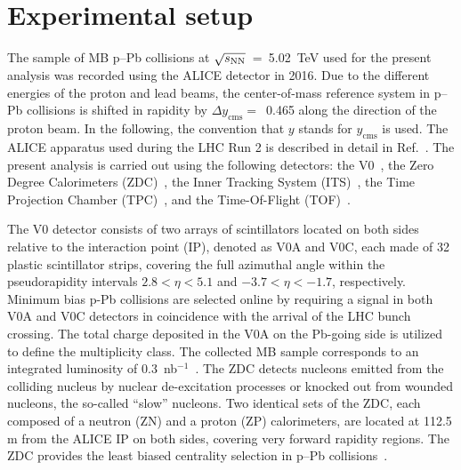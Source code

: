 \section{Experimental setup}
\label{sec:setup}
The sample of MB p--Pb collisions at $\sqrt{s_{\rm NN}}$~=~5.02~TeV used for the present analysis was recorded using the ALICE detector in 2016. Due to the different energies of the proton and lead beams, the center-of-mass reference system in p--Pb collisions is shifted in rapidity by $\Delta y_{\mathrm{cms}} =$~0.465 along the direction of the proton beam. In the following, the convention that $y$ stands for $y_{\mathrm{cms}}$ is used. The ALICE apparatus used during the LHC Run 2 is described in detail in Ref.~\cite{Abelev:2014ffa}. The present analysis is carried out using the following detectors: the V0~\cite{ALICE:2013axi}, the Zero Degree Calorimeters (ZDC)~\cite{Cortese:2019nnv}, the Inner Tracking System (ITS)~\cite{ALICE:2010tia}, the Time Projection Chamber (TPC)~\cite{Alme:2010ke}, and the Time-Of-Flight (TOF)~\cite{Jacazio:2018slq}. 

The V0 detector consists of two arrays of scintillators located on both sides relative to the interaction point (IP), denoted as V0A and V0C, each made of 32 plastic scintillator strips, covering the full azimuthal angle within the pseudorapidity intervals $2.8 < \eta < 5.1$ and $-3.7 < \eta < -1.7$, respectively. Minimum bias p-Pb collisions are selected online by requiring a signal in both V0A and V0C detectors in coincidence with the arrival of the LHC bunch crossing. The total charge deposited in the V0A on the Pb-going side is utilized to define the multiplicity class. The collected MB sample corresponds to an integrated luminosity of 0.3~nb$^{-1}$~\cite{ALICE:2014gvw}. The ZDC detects nucleons emitted from the colliding nucleus by nuclear de-excitation processes or knocked out from wounded nucleons, the so-called “slow” nucleons. Two identical sets of the ZDC, each composed of a neutron (ZN) and a proton (ZP) calorimeters, are located at 112.5 m from the ALICE IP on both sides, covering very forward rapidity regions. The ZDC provides the least biased centrality selection in p--Pb collisions~\cite{ALICE:2014xsp}.

